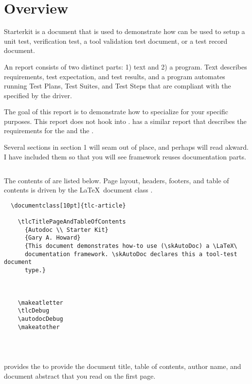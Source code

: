 \section{Overview}
Starterkit is a document that is used to demonstrate how \skAutoDoc can be
used to setup a unit test, verification test, a tool validation test
document, or a test record document.

An \skAutoDoc report consists of two distinct parts: 1) text and 2) a
program. Text describes requirements, test expectation, and test results, and
a program automates running Test Plans, Test Suites, and Test Steps that are
compliant with the \skOutputFactory specified by the \skAmber driver.

The goal of this report is to demonstrate how to specialize \skAutoDoc for your
specific purposes.  This report does not hook into \skAmber.  \skAmber has
a similar report that describes the requirements for the \skInputFactory and
the \skOutputFactory.

Several sections in section 1 will seam out of place, and perhaps will read
akward. I have included them so that you will see \skAutoDoc framework reuses
documentation parts.

\subsection{\skStarterkit}
The contents of \skStarterkit are listed below.  Page layout, headers, footers,
and table of contents is driven by the \LaTeX\ document class \skTlcArticle.

\begin{verbatim}
  \documentclass[10pt]{tlc-article}
  
    \tlcTitlePageAndTableOfContents
      {Autodoc \\ Starter Kit}
      {Gary A. Howard}
      {This document demonstrates how-to use (\skAutoDoc) a \LaTeX\
      documentation framework. \skAutoDoc declares this a tool-test document
      type.}

    

    \makeatletter
    \tlcDebug
    \autodocDebug
    \makeatother

  
\end{verbatim}

\subsection{\skToc}
\textbf{\skTlcArticle} provides the \skToc to provide the document title, table
of contents, author name, and document abstract that you read on the first page.

